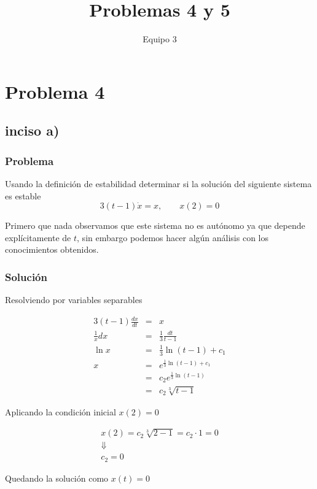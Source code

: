 \documentclass[10pt,letterpaper,titlepage]{article}
\author{Equipo 3}
\title{Problemas 4 y 5}
\begin{document}
\begin{titlepage}
	\maketitle
\end{titlepage}

\section{Problema 4}

\subsection{inciso a)}

\subsubsection{Problema}
Usando la definición de estabilidad determinar si la solución del siguiente sistema es estable
\[
	3(t-1)\dot{x} = x, \qquad x(2)=0
\]

Primero que nada observamos que este sistema no es autónomo ya que depende explícitamente de $t$, sin embargo podemos hacer algún análisis con los conocimientos obtenidos.

\subsubsection{Solución}
Resolviendo por variables separables

\[
	\begin{array}{rcl}
		3(t-1)\frac{dx}{dt} & = & x\\
		\frac{1}{x} dx & = & \frac{1}{3}\frac{dt}{t-1}\\
		\ln x & = & \frac{1}{3}\ln(t-1) + c_1\\
		x & = & e^{\frac{1}{3}\ln(t-1) + c_1}\\
		& = & c_2 e^{\frac{1}{3}\ln(t-1)}\\
		& = & c_2 \sqrt[3]{t-1}
	\end{array}
\]

Aplicando la condición inicial $x(2)=0$

\[
	\begin{array}{c}
		x(2) = c_2 \sqrt[3]{2-1} = c_2 \cdot 1 = 0\\
		\Downarrow\\
		c_2 = 0
	\end{array}
\]

Quedando la solución como $x(t) = 0$
\end{document}
